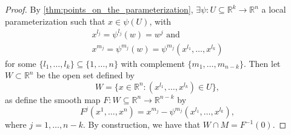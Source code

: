 \documentclass[notoc,notitlepage]{tufte-book}
\begin{document}
\begin{proof}
  By \cref{thm:points_on_the_parameterization}, $\exists \psi : U \subseteq
  \mathbb{R}^k \to \mathbb{R}^n$ a local parameterization such that $x \in
  \psi(U)$, with
  \begin{gather*}
    x^{l_j} = \psi^{l_j}(w) = w^j \text{ and } \\
    x^{m_j} = \psi^{m_j}(w) = \psi^{m_j}(x^{l_1}, \ldots, x^{l_k})
  \end{gather*}
  for some $\{ l_1, \ldots, l_k \} \subseteq \{ 1, \ldots, n \}$ with complement
  $\{ m_1, \ldots, m_{n - k} \}$. Then let $W \subset \mathbb{R}^n$ be the open
  set defined by
  \begin{equation*}
    W = \{ x \in \mathbb{R}^n : (x^{l_1}, \ldots, x^{l_k}) \in U \},
  \end{equation*}
  as define the smooth map $F : W \subseteq \mathbb{R}^n \to \mathbb{R}^{n - k}$
  by
  \begin{equation*}
    F^j(x^1, \ldots, x^n) = x^{m_j} - \psi^{m_j}(x^{l_1}, \ldots, x^{l_k}),
  \end{equation*}
  where $j = 1, \ldots, n - k$. By construction, we have that $W \cap M =
  F^{-1}(0)$.


\end{proof}
\end{document}
